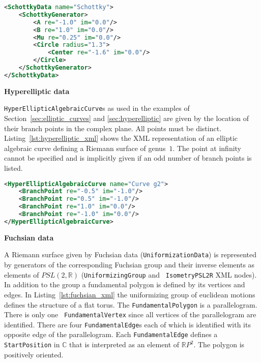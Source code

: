 \documentclass[Thesis.tex]{subfiles}
\begin{document}
\begin{lstlisting}[label=lst:schottky_xml, caption={A torus given by Schottky data}, 
numbers=none, language=XML, captionpos=b]
<SchottkyData name="Schottky">
	<SchottkyGenerator>
		<A re="-1.0" im="0.0"/>
		<B re="1.0" im="0.0"/>
		<Mu re="0.25" im="0.0"/>
		<Circle radius="1.3">
			<Center re="-1.6" im="0.0"/>
		</Circle>
	</SchottkyGenerator>
</SchottkyData>
\end{lstlisting}

{\bf Hyperelliptic data} 

{\tt HyperEllipticAlgebraicCurve}s as used in the examples of
Section~\ref{sec:elliptic_curves} and \ref{sec:hyperelliptic} are
given by the location of their branch points in the complex plane. All points
must be distinct. Listing~\ref{lst:hyperelliptic_xml} shows the XML
representation of an elliptic algebraic curve defining a Riemann surface of
genus~$1$. The point at infinity cannot be specified and is implicitly given if
an odd number of branch points is listed.

\begin{lstlisting}[label=lst:hyperelliptic_xml, caption={A torus given as 
hyperelliptic data}, numbers=none, language=XML, captionpos=b]
<HyperEllipticAlgebraicCurve name="Curve g2">
	<BranchPoint re="-0.5" im="-1.0"/>
	<BranchPoint re="0.5" im="-1.0"/>
	<BranchPoint re="1.0" im="0.0"/>
	<BranchPoint re="-1.0" im="0.0"/>
</HyperEllipticAlgebraicCurve>
\end{lstlisting}

{\bf Fuchsian data}

A Riemann surface given by Fuchsian data ({\tt UniformizationData}) is
represented by generators of the corresponding Fuchsian group and their inverse
elements as elements of $PSL(2,\mathbb R)$ ({\tt UniformizingGroup} and {\tt
IsometryPSL2R} XML nodes). In addition to the group a fundamental polygon is
defined by its vertices and edges. In Listing~\ref{lst:fuchsian_xml} the
uniformizing group of euclidean motions defines the structure of a flat torus.
The {\tt FundamentalPolygon} is a parallelogram. There is only one {\tt
FundamentalVertex} since all vertices of the parallelogram are identified.
There are four {\tt FundamentalEdge}s each of which is identified with its
opposite edge of the parallelogram. Each {\tt FundamentalEdge} defines a {\tt
StartPosition} in $\mathbb C$ that is interpreted as an element of $\mathbb R
P^2$. The polygon is positively oriented.
\end{document}
